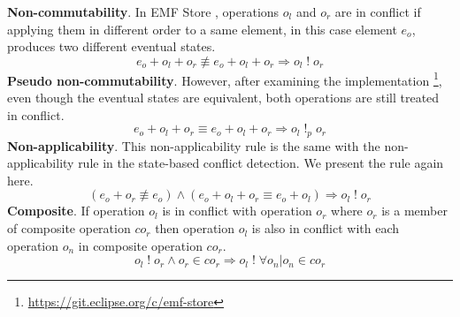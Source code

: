\textbf{Non-commutability}. In EMF Store \cite{koegel2010emfstore} , operations $o_{l}$ and $o_{r}$ are in conflict if applying them in different order to a same element, in this case element $e_{o}$, produces two different eventual states.
\begin{equation} \label{eq:conflict_1.3}
e_{o} + o_{l} + o_{r} \not\equiv e_{o} + o_{l} + o_{r} \Rightarrow o_{l}\;!\;o_{r}
\end{equation} 
\textbf{Pseudo non-commutability}. However, after examining the implementation \footnote{\url{https://git.eclipse.org/c/emf-store}}, even though the eventual states are equivalent, both operations are still treated  in conflict. 
\begin{equation} \label{eq:conflict_1.5}
e_{o} + o_{l} + o_{r} \equiv e_{o} + o_{l} + o_{r} \Rightarrow o_{l}\;!_{p}\;o_{r}
\end{equation} 
\textbf{Non-applicability}. This non-applicability rule is the same with the non-applicability rule in the state-based conflict detection. We present the rule again here. 
\begin{equation} \label{eq:conflict_1.6}
(e_{o} + o_{r} \not\equiv e_{o}) \wedge (e_{o} + o_{l} + o_{r} \equiv e_{o} + o_{l}) \Rightarrow o_{l}\;!\;o_{r}
\end{equation}
\textbf{Composite}. If operation $o_{l}$ is in conflict with operation $o_{r}$ where $o_{r}$ is a member of composite operation $co_{r}$ then operation $o_{l}$ is also in conflict with each operation $o_{n}$ in composite operation $co_{r}$.
\begin{equation} \label{eq:conflict_1.7}
o_{l}\;!\;o_{r} \wedge o_{r} \in co_{r} \Rightarrow o_{l}\;!\; \forall o_{n} | o_{n} \in co_{r}
\end{equation}

